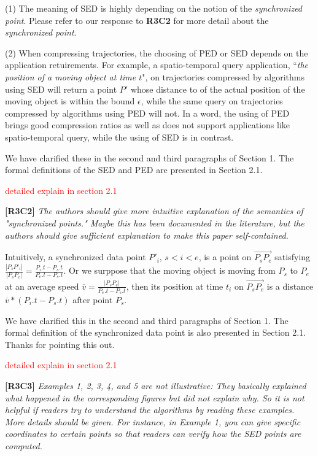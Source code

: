 \documentclass{letter}
\begin{document}
(1) The meaning of SED is highly depending on the notion of the \emph{synchronized point}. Please refer to our response to \textbf{R3C2} for more detail about the \emph{synchronized point}.

(2) When compressing trajectories, the choosing of PED or SED depends on the application retuirements. For example, a spatio-temporal query application, ``\emph{the position of a moving object at time $t$}", on trajectories compressed by algorithms using SED will return a point $P'$ whose distance to of the actual position of the moving object is within the bound $\epsilon$, while the same query on trajectories compressed by algorithms using PED will not. In a word, the using of PED brings good compression ratios as well as does not support applications like spatio-temporal query, while the using of SED is in contrast.

We have clarified these in the second and third paragraphs of Section 1.
The formal definitions of the SED and PED are presented in Section 2.1.

\textcolor{red}{detailed explain in section 2.1}

\textbf{[R3C2]} \emph{The authors should give more intuitive explanation of the semantics of "synchronized points." Maybe this has been documented in the literature, but the authors should give sufficient explanation to make this paper self-contained.}

Intuitively, a synchronized data point $P'_i$, $s<i<e$, is a point on $\overrightarrow{P_sP_{e}}$ satisfying $\frac{|P_sP'_i|}{|P_sP_e|} = \frac{P_i.t - P_s.t}{P_e.t-P_s.t}$.
Or we surppose that the moving object is moving from $P_s$ to $P_e$ at an average speed $\overline{v} = \frac{|P_sP_e|}{P_e.t-P_s.t}$, then its position at time $t_i$ on $\overrightarrow{P_sP_{e}}$ is a distance $\overline{v}*(P_i.t-P_s.t)$ after point $P_s$.

We have clarified this in the second and third paragraphs of Section 1. The formal definition of the synchronized data point is also presented in Section 2.1.
Thanks for pointing this out.


\textcolor{red}{detailed explain in section 2.1}

\textbf{[R3C3]} \emph{Examples 1, 2, 3, 4, and 5 are not illustrative: They basically explained what happened in the corresponding figures but did not explain why. So it is not helpful if readers try to understand the algorithms by reading these examples. More details should be given. For instance, in Example 1, you can give specific coordinates to certain points so that readers can verify how the SED points are computed.}
\end{document}
